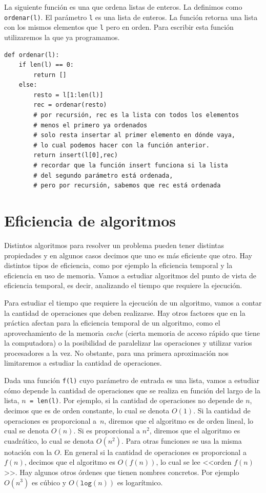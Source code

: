 \documentclass[a4paper, 12pt]{report}
\theoremstyle{definition}
\begin{document}
La siguiente función es una que ordena listas de enteros. La definimos como {\tt ordenar(l)}. El parámetro {\tt l} es una lista de enteros. La función retorna una lista con los mismos elementos que {\tt l} pero en orden. Para escribir esta función utilizaremos la que ya programamos.
\begin{verbatim}
def ordenar(l):
    if len(l) == 0:
        return []
    else:
        resto = l[1:len(l)]
        rec = ordenar(resto)
        # por recursión, rec es la lista con todos los elementos
        # menos el primero ya ordenados
        # solo resta insertar al primer elemento en dónde vaya,
        # lo cual podemos hacer con la función anterior.
        return insert(l[0],rec)
        # recordar que la función insert funciona si la lista
        # del segundo parámetro está ordenada,
        # pero por recursión, sabemos que rec está ordenada
\end{verbatim}

\section{Eficiencia de algoritmos}

Distintos algoritmos para resolver un problema pueden tener distintas propiedades y en algunos casos decimos que uno es más eficiente que otro. Hay distintos tipos de eficiencia, como por ejemplo la eficiencia temporal y la eficiencia en uso de memoria. Vamos a estudiar algoritmos del punto de vista de eficiencia temporal, es decir, analizando el tiempo que requiere la ejecución.

Para estudiar el tiempo que requiere la ejecución de un algoritmo, vamos a contar la cantidad de operaciones que deben realizarse. Hay otros factores que en la práctica afectan para la eficiencia temporal de un algoritmo, como el aprovechamiento de la memoria {\sl cache} (cierta memoria de acceso rápido que tiene la computadora) o la posibilidad de paralelizar las operaciones y utilizar varios procesadores a la vez. No obstante, para una primera aproximación nos limitaremos a estudiar la cantidad de operaciones.

Dada una función {\tt f(l)} cuyo parámetro de entrada es una lista, vamos a estudiar cómo depende la cantidad de operaciones que se realiza en función del largo de la lista, {\tt $n$~=~len(l)}. Por ejemplo, si la cantidad de operaciones no depende de $n$, decimos que es de orden constante, lo cual se denota $O(1)$. Si la cantidad de operaciones es proporcional a~$n$, diremos que el algoritmo es de orden lineal, lo cual se denota $O(n)$. Si es proporcional a $n^2$, diremos que el algoritmo es cuadrático, lo cual se denota $O(n^2)$. Para otras funciones se usa la misma notación con la $O$. En general si la cantidad de operaciones es proporcional a $f(n)$, decimos que el algoritmo es $O(f(n))$, lo cual se lee <<orden $f(n)$>>. Hay algunos otros órdenes que tienen nombres concretos. Por ejemplo $O(n^3)$ es cúbico y $O(\mathtt{log}(n))$ es logarítmico.
\end{document}
